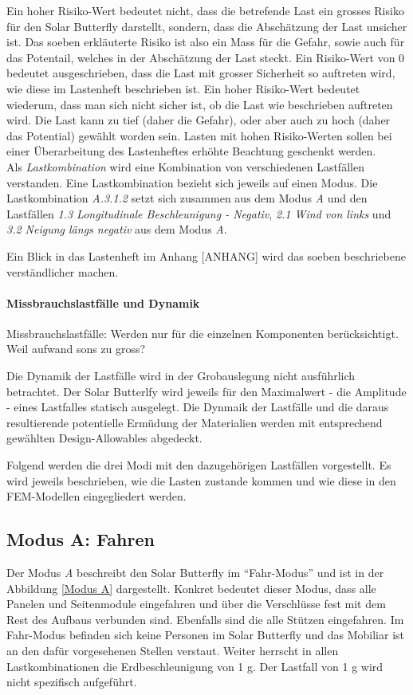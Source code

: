 Ein hoher Risiko-Wert bedeutet nicht, dass die betrefende Last ein grosses Risiko für den Solar Butterfly darstellt, sondern, dass die Abschätzung der Last unsicher ist. Das soeben erkläuterte Risiko ist also ein Mass für die Gefahr, sowie auch für das Potentail, welches in der Abschätzung der Last steckt. Ein Risiko-Wert von 0 bedeutet ausgeschrieben, dass die Last mit grosser Sicherheit so auftreten wird, wie diese im Lastenheft beschrieben ist. Ein hoher Risiko-Wert bedeutet wiederum, dass man sich nicht sicher ist, ob die Last wie beschrieben auftreten wird. Die Last kann zu tief (daher die Gefahr), oder aber auch zu hoch (daher das Potential) gewählt worden sein. Lasten mit hohen Risiko-Werten sollen bei einer Überarbeitung des Lastenheftes erhöhte Beachtung geschenkt werden.\\
Als \emph{Lastkombination} wird eine Kombination von verschiedenen Lastfällen verstanden. Eine Lastkombination bezieht sich jeweils auf einen Modus. Die Lastkombination \emph{A.3.1.2} setzt sich zusammen aus dem Modus \emph{A} und den Lastfällen \emph{1.3 Longitudinale Beschleunigung - Negativ}, \emph{2.1 Wind von links} und \emph{3.2 Neigung längs negativ} aus dem Modus \emph{A}.

Ein Blick in das Lastenheft im Anhang [ANHANG] wird das soeben beschriebene verständlicher machen.\\

\paragraph{Missbrauchslastfälle und Dynamik}
Missbrauchslastfälle: Werden nur für die einzelnen Komponenten berücksichtigt. Weil aufwand sons zu gross?

Die Dynamik der Lastfälle wird in der Grobauslegung nicht ausführlich betrachtet. Der Solar Butterlfy wird jeweils für den Maximalwert - die Amplitude - eines Lastfalles statisch ausgelegt. Die Dynmaik der Lastfälle und die daraus resultierende potentielle Ermüdung der Materialien werden mit entsprechend gewählten Design-Allowables abgedeckt. 

Folgend werden die drei Modi mit den dazugehörigen Lastfällen vorgestellt. Es wird jeweils beschrieben, wie die Lasten zustande kommen und wie diese in den FEM-Modellen eingegliedert werden.

\subsection{Modus A: Fahren}
Der Modus \emph{A} beschreibt den Solar Butterfly im ``Fahr-Modus'' und ist in der Abbildung \ref{Modus A} dargestellt. Konkret bedeutet dieser Modus, dass alle Panelen und Seitenmodule eingefahren und über die Verschlüsse fest mit dem Rest des Aufbaus verbunden sind. Ebenfalls sind die alle Stützen eingefahren. Im Fahr-Modus befinden sich keine Personen im Solar Butterfly und das Mobiliar ist an den dafür vorgesehenen Stellen verstaut. Weiter herrscht in allen Lastkombinationen die Erdbeschleunigung von 1 g. Der Lastfall von 1 g wird nicht spezifisch aufgeführt.

